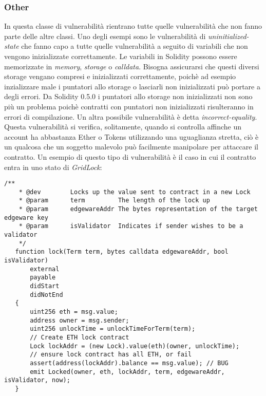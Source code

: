 \documentclass[../../Thesis.tex]{subfiles}
\begin{document}
\subsubsection{Other}
In questa classe di vulnerabilità rientrano tutte quelle vulnerabilità che non fanno parte delle altre classi. Uno degli esempi sono le vulnerabilità di \emph{uninitialized-state} che fanno capo a tutte quelle vulnerabilità a seguito di variabili che non vengono inizializzate correttamente. Le variabili in Solidity possono essere memorizzate in \emph{memory}, \emph{storage} o \emph{calldata}. Bisogna assicurarsi che questi diversi storage vengano compresi e inizializzati correttamente, poichè ad esempio inzializzare male i puntatori allo storage o lasciarli non inizializzati può portare a degli errori. Da Solidity 0.5.0 i puntatori allo storage non inizializzati non sono più un problema poichè contratti con puntatori non inizializzati risulteranno in errori di compilazione.  
Un altra possibile vulnerabilità è detta \emph{incorrect-equality}. Questa vulnerabilità si verifica, solitamente, quando si controlla affinche un account ha abbastanza Ether o Tokens utilizzando una uguaglianza stretta, ciò è un qualcosa che un soggetto malevolo può facilmente manipolare per attaccare il contratto. Un esempio di questo tipo di vulnerabilità è il caso in cui il contratto entra in uno stato di \emph{GridLock}:
\begin{lstlisting}[language=Solidity]
    /**
    * @dev        Locks up the value sent to contract in a new Lock
    * @param      term         The length of the lock up
    * @param      edgewareAddr The bytes representation of the target edgeware key
    * @param      isValidator  Indicates if sender wishes to be a validator
    */
   function lock(Term term, bytes calldata edgewareAddr, bool isValidator)
       external
       payable
       didStart
       didNotEnd
   {
       uint256 eth = msg.value;
       address owner = msg.sender;
       uint256 unlockTime = unlockTimeForTerm(term);
       // Create ETH lock contract
       Lock lockAddr = (new Lock).value(eth)(owner, unlockTime);
       // ensure lock contract has all ETH, or fail
       assert(address(lockAddr).balance == msg.value); // BUG
       emit Locked(owner, eth, lockAddr, term, edgewareAddr, isValidator, now);
   }
\end{lstlisting}
\end{document}
